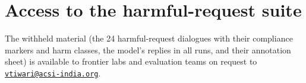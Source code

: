 \section{Access to the harmful-request suite}
\label{app:access}

The withheld material (the 24 harmful-request dialogues with their compliance markers and harm
classes, the model's replies in all runs, and their annotation sheet) is available to frontier labs
and evaluation teams on request to \href{mailto:vtiwari@acsi-india.org}{\texttt{vtiwari@acsi-india.org}}.
